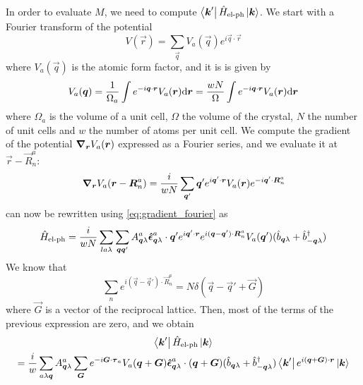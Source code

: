 In order to evaluate $M$, we need to compute $\bra{\mathbf{\boldsymbol{k}}'} \hat{H}_\text{el-ph} \ket{\mathbf{\boldsymbol{k}}}$. We start with a Fourier transform of the potential
\begin{equation}
    V(\vec{r}) = \sum_\vec{q} V_a(\vec{q})e^{i\vec{q}\cdot\vec{r}}
\end{equation}
where $V_a(\vec{q})$ is the atomic form factor, and it is is given by
\begin{equation}
    V_a(\vec{q}) = \frac{1}{\Omega_a} \int e^{-i\vec{q
            }\cdot \vec{r}} V_a(\vec{r}) \differential \vec{r} = \frac{wN}{\Omega} \int e^{-i\vec{q
            }\cdot \vec{r}} V_a(\vec{r}) \differential \vec{r}
\end{equation}
where $\Omega_a$ is the volume of a unit cell, $\Omega$ the volume of the crystal, $N$ the number of unit cells and $w$ the number of atoms per unit cell. We compute the gradient of the potential $\grad_{\mathbf{\boldsymbol{r}}} V_a(\mathbf{\boldsymbol{r}})$ expressed as a Fourier series, and we evaluate it at $\vec{r}-\vec{R}_n^a$:
\begin{equation}\label{eq:gradient_fourier}
    \grad_{\mathbf{\boldsymbol{r}}} V_a(\mathbf{\boldsymbol{r}} - \mathbf{\boldsymbol{R}}_n^a) = \frac{i}{wN} \sum_{\mathbf{\boldsymbol{q}}'} \mathbf{\boldsymbol{q}}' e^{i\mathbf{\boldsymbol{q}}'\cdot \mathbf{\boldsymbol{r}}} V_a(\mathbf{\boldsymbol{r}}) e^{-i\mathbf{\boldsymbol{q}}'\cdot \mathbf{\boldsymbol{R}}_n^a}
\end{equation}
 can now be rewritten using \cref{eq:gradient_fourier} as
\begin{equation}
    \hat{H}_\text{el-ph} = \frac{i}{wN} \sum_{la\lambda} \sum_{\mathbf{\boldsymbol{q}}\mathbf{\boldsymbol{q}}'} A_{\mathbf{\boldsymbol{q}}\lambda}^a \mathbf{\boldsymbol{\hat{\epsilon}}}_{\mathbf{\boldsymbol{q}}\lambda}^a \cdot \mathbf{\boldsymbol{q}}' e^{i\mathbf{\boldsymbol{q}}'\cdot \mathbf{\boldsymbol{r}}} e^{i(\mathbf{\boldsymbol{q}}-\mathbf{\boldsymbol{q}}') \cdot \mathbf{\boldsymbol{R}}_n^a} V_a(\mathbf{\boldsymbol{q}}'   )  (\hat{b}_{\mathbf{\boldsymbol{q}}\lambda} + \hat{b}^\dagger_{-\mathbf{\boldsymbol{q}}\lambda})
\end{equation}
We know that
\begin{equation}
    \sum_n e^{i(\vec{q}-\vec{q}') \cdot \vec{R}_n^a} = N \delta(\vec{q} - \vec{q}' + \vec{G})
\end{equation}
where $\vec{G}$ is a vector of the reciprocal lattice. Then, most of the terms of the previous expression are zero, and we obtain
\begin{multline}
    \bra{\mathbf{\boldsymbol{k}}'}\hat{H}_\text{el-ph}\ket{\mathbf{\boldsymbol{k}}}
    \\ = \frac{i}{w} \sum_{a\lambda\mathbf{\boldsymbol{q}}} A_{\mathbf{\boldsymbol{q}}\lambda}^a \sum_{\mathbf{\boldsymbol{G}}}  e^{-i \mathbf{\boldsymbol{G}} \cdot \mathbf{\boldsymbol{\tau}}_a} V_a(\mathbf{\boldsymbol{q}} + \mathbf{\boldsymbol{G}}   ) \mathbf{\boldsymbol{\hat{\epsilon}}}_{\mathbf{\boldsymbol{q}}\lambda}^a \cdot (\mathbf{\boldsymbol{q}}+\mathbf{\boldsymbol{G}}) (\hat{b}_{\mathbf{\boldsymbol{q}}\lambda} + \hat{b}^\dagger_{-\mathbf{\boldsymbol{q}}\lambda}) \bra{\mathbf{\boldsymbol{k}}'} e^{i(\mathbf{\boldsymbol{q}} + \mathbf{\boldsymbol{G}})\cdot \mathbf{\boldsymbol{r}}} \ket{\mathbf{\boldsymbol{k}}}
\end{multline}
